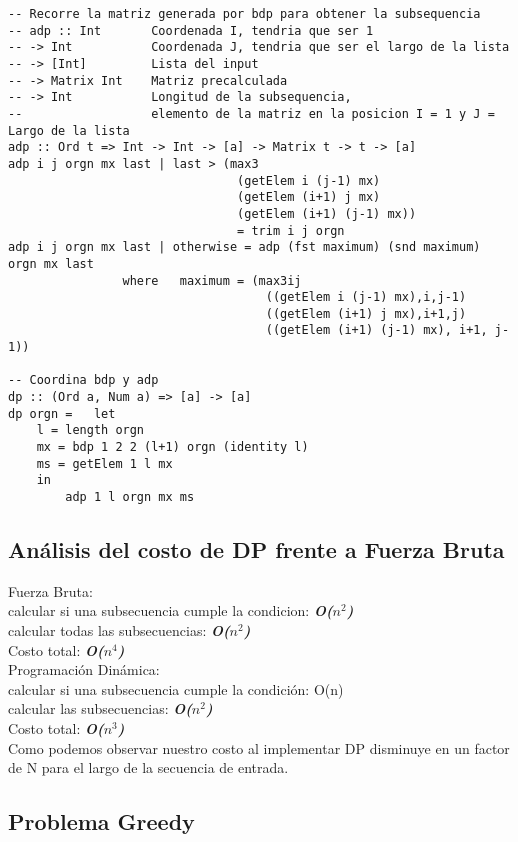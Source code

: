 \documentclass[10pt]{article}
\begin{document}
\begin{verbatim}
-- Recorre la matriz generada por bdp para obtener la subsequencia 
-- adp :: Int       Coordenada I, tendria que ser 1
-- -> Int           Coordenada J, tendria que ser el largo de la lista
-- -> [Int]         Lista del input
-- -> Matrix Int    Matriz precalculada
-- -> Int           Longitud de la subsequencia, 
--                  elemento de la matriz en la posicion I = 1 y J = Largo de la lista
adp :: Ord t => Int -> Int -> [a] -> Matrix t -> t -> [a]
adp i j orgn mx last | last > (max3
                                (getElem i (j-1) mx) 
                                (getElem (i+1) j mx) 
                                (getElem (i+1) (j-1) mx)) 
                                = trim i j orgn
adp i j orgn mx last | otherwise = adp (fst maximum) (snd maximum) orgn mx last
        		where 	maximum = (max3ij 
        		                    ((getElem i (j-1) mx),i,j-1)    
        		                    ((getElem (i+1) j mx),i+1,j) 
        		                    ((getElem (i+1) (j-1) mx), i+1, j-1))
                        
-- Coordina bdp y adp
dp :: (Ord a, Num a) => [a] -> [a]
dp orgn =   let
    l = length orgn
    mx = bdp 1 2 2 (l+1) orgn (identity l)
    ms = getElem 1 l mx
    in
        adp 1 l orgn mx ms

 \end{verbatim}
 \subsection*{An\'alisis del costo de DP frente a Fuerza Bruta}
 Fuerza Bruta:\\
calcular si una subsecuencia cumple la condicion: \textbf{\textit{O($n^{2}$)}}\\
calcular todas las subsecuencias: \textbf{\textit{O($n^{2}$)}}\\
Costo total: \textbf{\textit{O($n^{4}$)}}\\
Programaci\'on Din\'amica:\\
calcular si una subsecuencia cumple la condici\'on: O(n)\\
calcular las subsecuencias: \textbf{\textit{O($n^{2}$)}}\\
Costo total: \textbf{\textit{O($n^{3}$)}}\\

Como podemos observar nuestro costo al implementar DP disminuye en un factor de N para el largo de la secuencia de entrada.

	\newpage
	\begin{center}
		\section*{\LARGE Problema Greedy}
	\end{center}
\end{document}
